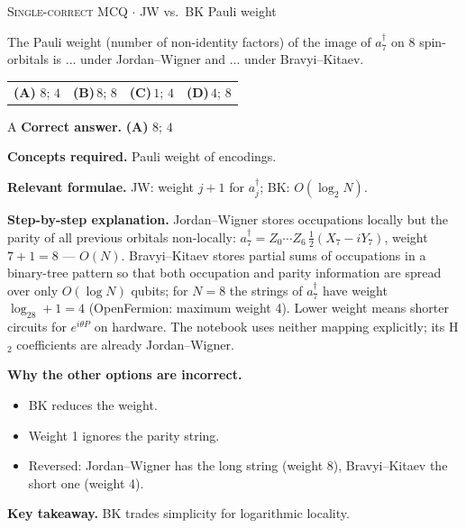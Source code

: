\documentclass[11pt,a4paper]{article}
\newcommand{\optlabel}[1]{\textbf{(#1)}}
\newcommand{\correctlabel}[1]{\textcolor{okgreen}{\textbf{(#1)}\,\ding{51}}}
\newenvironment{qitem}[1]{\begin{list}{}{\setlength{\leftmargin}{3.3em}\setlength{\labelwidth}{3.1em}%
  \setlength{\labelsep}{0.2em}\setlength{\topsep}{3pt}\setlength{\parsep}{3pt}}\item[\textbf{Q.#1}\hfill]}{\end{list}}
\newcommand{\qsep}{\par\vspace{2pt}{\color{black!15}\hrule}\vspace{4pt}}
\newcommand{\qmeta}[2]{{\footnotesize\color{black!60}\textsc{#1} \;$\cdot$\; #2}\par}
\begin{document}
\begin{qitem}{63}
\qmeta{Single-correct MCQ}{JW vs.\ BK Pauli weight}
The Pauli weight (number of non-identity factors) of the image of $a_7^\dagger$ on 8 spin-orbitals is ... under Jordan--Wigner and ... under Bravyi--Kitaev.
\par\smallskip\noindent\begin{tabularx}{\linewidth}{@{}*{4}{L}@{}}
\correctlabel{A}\,$8$; $4$ & \optlabel{B}\,$8$; $8$ & \optlabel{C}\,$1$; $4$ & \optlabel{D}\,$4$; $8$
\end{tabularx}
\end{qitem}
\begin{solbox}{A}
\textbf{\color{brand}Correct answer.} \textcolor{okgreen}{\textbf{(A)}} $8$; $4$

\textbf{\color{brand}Concepts required.} Pauli weight of encodings.

\textbf{\color{brand}Relevant formulae.} JW: weight $j + 1$ for $a_j^\dagger$; BK: $O(\log_2N)$.

\textbf{\color{brand}Step-by-step explanation.} Jordan--Wigner stores occupations locally but the parity of all previous orbitals non-locally: $a_7^\dagger = Z_0\cdots Z_6\,\tfrac12(X_7 - iY_7)$, weight $7 + 1 = 8$ --- $O(N)$.
Bravyi--Kitaev stores partial sums of occupations in a binary-tree pattern so that both occupation and parity information are spread over only
$O(\log N)$ qubits; for $N = 8$ the strings of $a_7^\dagger$ have weight $\log_28 + 1 = 4$ (OpenFermion: maximum weight 4). Lower weight means
shorter circuits for $e^{i\theta P}$ on hardware. The notebook uses neither mapping explicitly; its H$_2$ coefficients are already Jordan--Wigner.

\textbf{\color{brand}Why the other options are incorrect.}
\begin{itemize}[leftmargin=2.4em, itemsep=1pt, topsep=2pt]
\item[\textbf{(B)}] BK reduces the weight.
\item[\textbf{(C)}] Weight 1 ignores the parity string.
\item[\textbf{(D)}] Reversed: Jordan--Wigner has the long string (weight 8), Bravyi--Kitaev the short one (weight 4).
\end{itemize}
\textbf{\color{brand}Key takeaway.} BK trades simplicity for logarithmic locality.
\end{solbox}
\qsep
\end{document}
